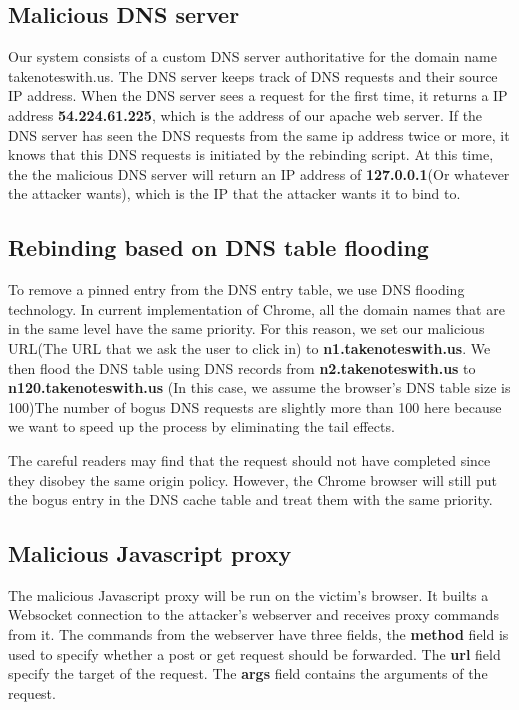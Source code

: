 \subsection{Malicious DNS server}
Our system consists of a custom DNS server authoritative for the domain name takenoteswith.us. The DNS server keeps track of DNS requests and their source IP address. When the DNS server sees a request for the first time, it returns a IP address \textbf{54.224.61.225}, which is the address of our apache web server. If the DNS server has seen the DNS requests from the same ip address twice or more, it knows that this DNS requests is initiated by the rebinding script. At this time, the the malicious DNS server will return an IP address of \textbf{127.0.0.1}(Or whatever the attacker wants), which is the IP that the attacker wants it to bind to.

\subsection{Rebinding based on DNS table flooding}
To remove a pinned entry from the DNS entry table, we use DNS flooding technology. In current implementation of Chrome, all the domain names that are in the same level have the same priority. For this reason, we set our malicious URL(The URL that we ask the user to click in) to \textbf{n1.takenoteswith.us}.
We then flood the DNS table using DNS records from \textbf{n2.takenoteswith.us} to \textbf{n120.takenoteswith.us} (In this case, we assume the browser's DNS table size is 100)The number of bogus DNS requests are slightly more than 100 here because we want to speed up the process by eliminating the tail effects.

The careful readers may find that the request should not have completed since they disobey the same origin policy. However, the Chrome browser will still put the bogus entry in the DNS cache table and treat them with the same priority. 

\subsection{Malicious Javascript proxy}
The malicious Javascript proxy will be run on the victim's browser. It builts a Websocket connection to the attacker's webserver and receives proxy commands from it. The commands from the webserver have three fields, the \textbf{method} field is used to specify whether a post or get request should be forwarded. The \textbf{url} field specify the target of the request. The \textbf{args} field contains the arguments of the request.

